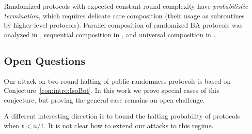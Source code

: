 Randomized protocols with expected constant round complexity have \emph{probabilistic termination}, which requires delicate care \wrt composition (\ie their usage as subroutines by higher-level protocols). Parallel composition of randomized BA protocols was analyzed in \cite{Ben-Or83,FG03}, sequential composition in \cite{LLR06}, and universal composition in \cite{CCGZ16,CCGZ17}.

\subsection{Open Questions}\label{sec:OpenQuest}
Our attack on two-round halting of public-randomness protocols is based on Conjecture~\ref{con:intro:IsoBot}. In this work we prove special cases of this conjecture, but proving the general case remains an open challenge.

A different interesting direction is to bound the halting probability of protocols when $t<n/4$. It is not clear how to extend our attacks to this regime.
